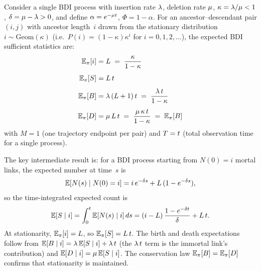 \begin{lemma}
\label{lem:expected-suffstats}
Consider a single BDI process with insertion rate $\lambda$,
deletion rate $\mu$, $\kappa = \lambda/\mu < 1$,
$\delta = \mu - \lambda > 0$,
and define $\alpha = e^{-\mu t}$,
$\Phi = 1 - \alpha$.
For an ancestor--descendant pair $(i,j)$ with ancestor length~$i$
drawn from the stationary distribution $i \sim \mathrm{Geom}(\kappa)$
(i.e.\ $P(i) = (1-\kappa)\kappa^i$ for $i = 0,1,2,\ldots$),
the expected BDI sufficient statistics are:
\begin{align}
\mathbb{E}_\pi[i] &= L \;=\; \frac{\kappa}{1-\kappa}
\label{eq:stat-L}
\\[4pt]
\mathbb{E}_\pi[S] &= L\,t
\label{eq:stat-ES}
\\[4pt]
\mathbb{E}_\pi[B] &= \lambda\,(L + 1)\,t
  \;=\; \frac{\lambda\,t}{1 - \kappa}
\label{eq:stat-EB}
\\[4pt]
\mathbb{E}_\pi[D] &= \mu\,L\,t
  \;=\; \frac{\mu\,\kappa\,t}{1 - \kappa}
  \;=\; \mathbb{E}_\pi[B]
\label{eq:stat-ED}
\end{align}
with $M = 1$ (one trajectory endpoint per pair) and $T = t$
(total observation time for a single process).

The key intermediate result is: for a BDI process starting from
$N(0) = i$ mortal links, the expected number at time~$s$ is
\begin{equation}\label{eq:bdi-mean}
\mathbb{E}[N(s) \mid N(0) = i]
  = i\,e^{-\delta s} + L\,(1 - e^{-\delta s}),
\end{equation}
so the time-integrated expected count is
\begin{equation}\label{eq:time-integrated}
\mathbb{E}[S \mid i] = \int_0^t \mathbb{E}[N(s) \mid i]\,ds
  = (i - L)\,\frac{1 - e^{-\delta t}}{\delta} + L\,t.
\end{equation}
At stationarity, $\mathbb{E}_\pi[i] = L$, so
$\mathbb{E}_\pi[S] = L\,t$.
The birth and death expectations follow from
$\mathbb{E}[B \mid i] = \lambda\,\mathbb{E}[S \mid i] + \lambda\,t$
(the $\lambda\,t$ term is the immortal link's contribution)
and $\mathbb{E}[D \mid i] = \mu\,\mathbb{E}[S \mid i]$.
The conservation law $\mathbb{E}_\pi[B] = \mathbb{E}_\pi[D]$ confirms
that stationarity is maintained.
\end{lemma}

